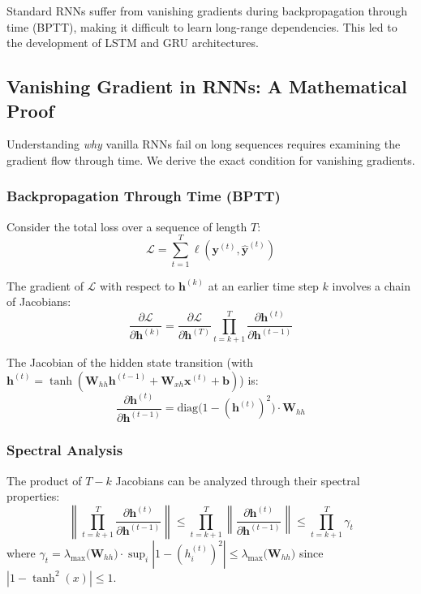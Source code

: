 \begin{note}
Standard RNNs suffer from vanishing gradients during backpropagation through time (BPTT), making it difficult to learn long-range dependencies. This led to the development of LSTM and GRU architectures.
\end{note}

\subsection{Vanishing Gradient in RNNs: A Mathematical Proof}

Understanding \emph{why} vanilla RNNs fail on long sequences requires examining the gradient flow through time. We derive the exact condition for vanishing gradients.

\subsubsection{Backpropagation Through Time (BPTT)}

Consider the total loss over a sequence of length $T$:
\begin{equation}
\mathcal{L} = \sum_{t=1}^{T} \ell(\mathbf{y}^{(t)}, \hat{\mathbf{y}}^{(t)})
\end{equation}

The gradient of $\mathcal{L}$ with respect to $\mathbf{h}^{(k)}$ at an earlier time step $k$ involves a chain of Jacobians:
\begin{equation}
\frac{\partial \mathcal{L}}{\partial \mathbf{h}^{(k)}} = \frac{\partial \mathcal{L}}{\partial \mathbf{h}^{(T)}} \prod_{t=k+1}^{T} \frac{\partial \mathbf{h}^{(t)}}{\partial \mathbf{h}^{(t-1)}}
\end{equation}

The Jacobian of the hidden state transition (with $\mathbf{h}^{(t)} = \tanh(\mathbf{W}_{hh}\mathbf{h}^{(t-1)} + \mathbf{W}_{xh}\mathbf{x}^{(t)} + \mathbf{b})$) is:
\begin{equation}
\frac{\partial \mathbf{h}^{(t)}}{\partial \mathbf{h}^{(t-1)}} = \text{diag}\bigl(1 - (\mathbf{h}^{(t)})^2\bigr) \cdot \mathbf{W}_{hh}
\end{equation}

\subsubsection{Spectral Analysis}

The product of $T - k$ Jacobians can be analyzed through their spectral properties:
\begin{equation}
\left\| \prod_{t=k+1}^{T} \frac{\partial \mathbf{h}^{(t)}}{\partial \mathbf{h}^{(t-1)}} \right\| \leq \prod_{t=k+1}^{T} \left\| \frac{\partial \mathbf{h}^{(t)}}{\partial \mathbf{h}^{(t-1)}} \right\| \leq \prod_{t=k+1}^{T} \gamma_t
\end{equation}
where $\gamma_t = \lambda_{\max}\bigl(\mathbf{W}_{hh}\bigr) \cdot \sup_i |1 - (h_i^{(t)})^2| \leq \lambda_{\max}\bigl(\mathbf{W}_{hh}\bigr)$ since $|1 - \tanh^2(x)| \leq 1$.

